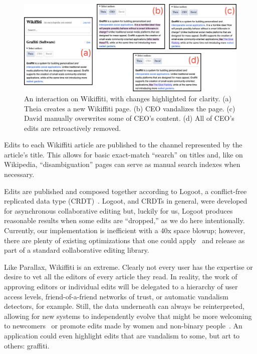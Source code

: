 \begin{figure}[htb]
    \centering
    \includegraphics[width=\textwidth]{paper/figures/wikiffiti.png}
    \caption{
    An interaction on Wikiffiti, with changes highlighted for clarity.
    (a) Theia creates a new Wikiffiti page. (b) CEO vandalizes the page. (c) David manually overwrites some of
    CEO's content. (d) All of CEO's edits are retroactively removed.}
    \label{case-studies:fig:wikiffiti}
\end{figure}

Edits to each Wikiffiti article are published to
the channel represented by the article's title.
This allows for basic exact-match ``search'' on titles and, like on Wikipedia,
``disambiguation'' pages can serve as manual search indexes when necessary.

Edits are published and composed together according to Logoot,
a conflict-free replicated data type (CRDT)~\cite{logoot,crdts}.
Logoot, and CRDTs in general, were developed for asynchronous collaborative editing
but, luckily for us, Logoot produces reasonable results when
some edits are ``dropped,'' as we do here intentionally.
Currently, our implementation is inefficient with a 40x space blowup;
however, there are plenty of existing optimizations that one could apply~\cite{logootbetter}
and release as part of a standard collaborative editing library.

Like Parallax, Wikiffiti is an extreme. Clearly not every user
has the expertise or desire to vet all the editors of
every article they read. In reality, the work of approving editors
or individual edits will be delegated to
a hierarchy of user access levels,
friend-of-a-friend networks of trust,
or automatic vandalism detectors, for example.
Still, the data underneath can always be reinterpreted, allowing
for new systems to independently evolve that
might be more welcoming to newcomers~\cite{wikibourgeoisie, wikirisedecline}
or promote edits made by women and non-binary people~\cite{wikigender}.
An application could even highlight edits that are vandalism to some,
but art to others: graffiti.



